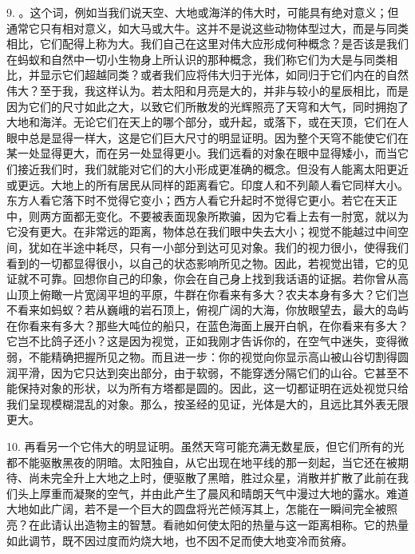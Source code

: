 9.  。这个词，例如当我们说天空、大地或海洋的伟大时，可能具有绝对意义；但通常它只有相对意义，如大马或大牛。这并不是说这些动物体型过大，而是与同类相比，它们配得上称为大。我们自己在这里对伟大应形成何种概念？是否该是我们在蚂蚁和自然中一切小生物身上所认识的那种概念，我们称它们为大是与同类相比，并显示它们超越同类？或者我们应将伟大归于光体，如同归于它们内在的自然伟大？至于我，我这样认为。若太阳和月亮是大的，并非与较小的星辰相比，而是因为它们的尺寸如此之大，以致它们所散发的光辉照亮了天穹和大气，同时拥抱了大地和海洋。无论它们在天上的哪个部分，或升起，或落下，或在天顶，它们在人眼中总是显得一样大，这是它们巨大尺寸的明显证明。因为整个天穹不能使它们在某一处显得更大，而在另一处显得更小。我们远看的对象在眼中显得矮小，而当它们接近我们时，我们就能对它们的大小形成更准确的概念。但没有人能离太阳更近或更远。大地上的所有居民从同样的距离看它。印度人和不列颠人看它同样大小。东方人看它落下时不觉得它变小；西方人看它升起时不觉得它更小。若它在天正中，则两方面都无变化。不要被表面现象所欺骗，因为它看上去有一肘宽，就以为它没有更大。在非常远的距离，物体总在我们眼中失去大小；视觉不能越过中间空间，犹如在半途中耗尽，只有一小部分到达可见对象。我们的视力很小，使得我们看到的一切都显得很小，以自己的状态影响所见之物。因此，若视觉出错，它的见证就不可靠。回想你自己的印象，你会在自己身上找到我话语的证据。若你曾从高山顶上俯瞰一片宽阔平坦的平原，牛群在你看来有多大？农夫本身有多大？它们岂不看来如蚂蚁？若从巍峨的岩石顶上，俯视广阔的大海，你放眼望去，最大的岛屿在你看来有多大？那些大吨位的船只，在蓝色海面上展开白帆，在你看来有多大？它岂不比鸽子还小？这是因为视觉，正如我刚才告诉你的，在空气中迷失，变得微弱，不能精确把握所见之物。而且进一步：你的视觉向你显示高山被山谷切割得圆润平滑，因为它只达到突出部分，由于软弱，不能穿透分隔它们的山谷。它甚至不能保持对象的形状，以为所有方塔都是圆的。因此，这一切都证明在远处视觉只给我们呈现模糊混乱的对象。那么，按圣经的见证，光体是大的，且远比其外表无限更大。\par

10. 再看另一个它伟大的明显证明。虽然天穹可能充满无数星辰，但它们所有的光都不能驱散黑夜的阴暗。太阳独自，从它出现在地平线的那一刻起，当它还在被期待、尚未完全升上大地之上时，便驱散了黑暗，胜过众星，消散并扩散了此前在我们头上厚重而凝聚的空气，并由此产生了晨风和晴朗天气中漫过大地的露水。难道大地如此广阔，若不是一个巨大的圆盘将光芒倾泻其上，怎能在一瞬间完全被照亮？在此请认出造物主的智慧。看祂如何使太阳的热量与这一距离相称。它的热量如此调节，既不因过度而灼烧大地，也不因不足而使大地变冷而贫瘠。\par

